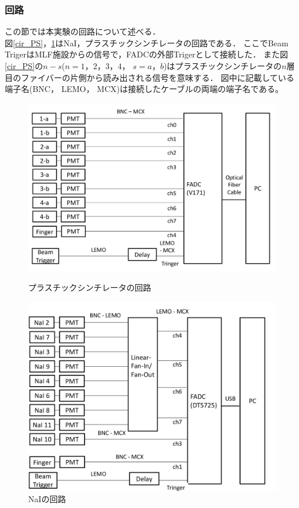 \subsubsection{回路}
この節では本実験の回路について述べる．\\
図\ref{cir_PS}，\ref{cir_nai}はNaI，プラスチックシンチレータの回路である．
ここでBeam TrigerはMLF施設からの信号で，FADCの外部Trigerとして接続した．
また図\ref{cir_PS}の$n-s$($n=1，2，3，4$， $s=a，b$)はプラスチックシンチレータの$n$層目のファイバーの片側から読み出される信号を意味する．
図中に記載している端子名(BNC， LEMO， MCX)は接続したケーブルの両端の端子名である。
\begin{figure}[H]
  \begin{minipage}{0.45\hsize}
    \begin{center}
      \includegraphics[width=1\textwidth]{figure/tajima/circuit_ps_2.png}
      \caption{プラスチックシンチレータの回路}
      \label{cir_PS}
    \end{center}
  \end{minipage}
  \hfill
  \begin{minipage}{0.45\hsize}
    \begin{center}
      \includegraphics[width=1\textwidth]{figure/tajima/circuit_nai.png}
      \caption{NaIの回路}
      \label{cir_nai}
    \end{center}
  \end{minipage}
\end{figure}
